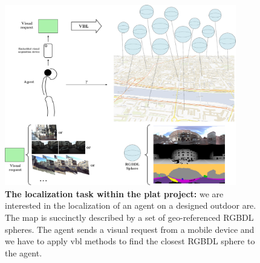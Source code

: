 \begin{figure}[t]
	\centering

	\includegraphics[width=0.9\textwidth]{env/plat_resume}
	\caption[Localization task in \acs*{plat}]{ \label{fig:plat_pipeline} \textbf{The localization task within the \acs*{plat} project:} we are interested in the localization of an agent on a designed outdoor are. The map is succinctly described by a set of geo-referenced RGBDL spheres. The agent sends a visual request from a mobile device and we have to apply \ac*{vbl} methods to find the closest RGBDL sphere to the agent.}
\end{figure}
